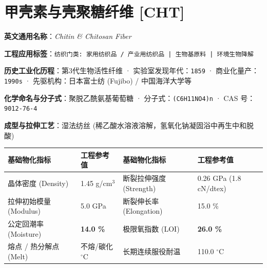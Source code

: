 \documentclass[11pt,openright,twoside,UTF8]{ctexbook}
\begin{document}
\section{甲壳素与壳聚糖纤维 [CHT]}
\label{sec:cht}

\noindent\textbf{英文通用名称}：\textit{Chitin \& Chitosan Fiber}\par
\noindent\textbf{工程应用标签}：\texttt{纺织门类: 家用纺织品 / 产业用纺织品 | 生物基原料 | 环境生物降解}\par
\noindent\textbf{历史工业化历程}：第3代生物活性纤维 · 实验室发现年代：\texttt{1859} · 商业化量产：\texttt{1990s} · 先驱机构：日本富士纺 (Fujibo) / 中国海洋大学等\par
\noindent\textbf{化学命名与分子式}：聚脱乙酰氨基葡萄糖 · 分子式：\texttt{(C6H11NO4)n} · CAS 号：\texttt{9012-76-4}\par
\noindent\textbf{成型与拉伸工艺}：湿法纺丝 (稀乙酸水溶液溶解，氢氧化钠凝固浴中再生中和脱酸)\par

\vspace{0.15cm}
\begin{center}
\small
\begin{tabularx}{\textwidth}{p{3.8cm}Xp{3.8cm}X}
\toprule
\textbf{基础物化指标} & \textbf{工程参考值} & \textbf{基础物化指标} & \textbf{工程参考值} \\
\midrule
晶体密度 (Density) & 1.45 g/cm$^3$ & 断裂拉伸强度 (Strength) & 0.26 GPa (1.8 cN/dtex) \\
拉伸初始模量 (Modulus) & 5.0 GPa & 断裂伸长率 (Elongation) & 15.0 \% \\
公定回潮率 (Moisture) & \textbf{14.0 \%} & 极限氧指数 (LOI) & \textbf{26.0 \%} \\
熔点 / 热分解点 (Melt) & 不熔/碳化 $^\circ\mathrm{C}$ & 长期连续服役耐温 & 110.0 $^\circ\mathrm{C}$ \\
\bottomrule
\end{tabularx}
\end{center}
\vspace{0.15cm}
\end{document}

